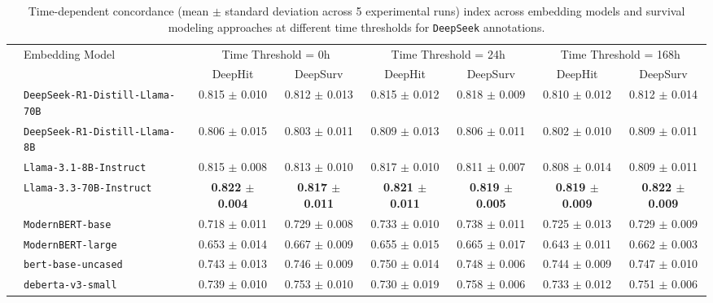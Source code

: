 \begin{table}[!thbp]
  \centering
  \caption{Time-dependent concordance (mean $\pm$ standard deviation across 5 experimental runs) index across embedding models and survival modeling approaches at different time thresholds for \texttt{DeepSeek} annotations.}
  \begin{adjustbox}{width=\textwidth}
  \begin{tabular}{c lcccccc}
    \toprule
    & \multirow{2}{*}{Embedding Model} &
      \multicolumn{2}{c}{Time Threshold = 0h} &
      \multicolumn{2}{c}{Time Threshold = 24h} &
      \multicolumn{2}{c}{Time Threshold = 168h} \\
    \cmidrule(lr){3-4} \cmidrule(lr){5-6} \cmidrule(lr){7-8}
    &  & DeepHit & DeepSurv & DeepHit & DeepSurv & DeepHit & DeepSurv \\
    \midrule
    & \texttt{DeepSeek-R1-Distill-Llama-70B} & 0.815 $\pm$ 0.010 & 0.812 $\pm$ 0.013 & 0.815 $\pm$ 0.012 & 0.818 $\pm$ 0.009 & 0.810 $\pm$ 0.012 & 0.812 $\pm$ 0.014 \\
    & \texttt{DeepSeek-R1-Distill-Llama-8B}  & 0.806 $\pm$ 0.015 & 0.803 $\pm$ 0.011 & 0.809 $\pm$ 0.013 & 0.806 $\pm$ 0.011 & 0.802 $\pm$ 0.010 & 0.809 $\pm$ 0.011 \\
    & \texttt{Llama-3.1-8B-Instruct}         & 0.815 $\pm$ 0.008 & 0.813 $\pm$ 0.010 & 0.817 $\pm$ 0.010 & 0.811 $\pm$ 0.007 & 0.808 $\pm$ 0.014 & 0.809 $\pm$ 0.011 \\
    & \texttt{Llama-3.3-70B-Instruct}        & \textbf{0.822 $\pm$ 0.004} & \textbf{0.817 $\pm$ 0.011} & \textbf{0.821 $\pm$ 0.011} & \textbf{0.819 $\pm$ 0.005} & \textbf{0.819 $\pm$ 0.009} & \textbf{0.822 $\pm$ 0.009} \\
    & \texttt{ModernBERT-base}               & 0.718 $\pm$ 0.011 & 0.729 $\pm$ 0.008 & 0.733 $\pm$ 0.010 & 0.738 $\pm$ 0.011 & 0.725 $\pm$ 0.013 & 0.729 $\pm$ 0.009 \\
    & \texttt{ModernBERT-large}              & 0.653 $\pm$ 0.014 & 0.667 $\pm$ 0.009 & 0.655 $\pm$ 0.015 & 0.665 $\pm$ 0.017 & 0.643 $\pm$ 0.011 & 0.662 $\pm$ 0.003 \\
    & \texttt{bert-base-uncased}             & 0.743 $\pm$ 0.013 & 0.746 $\pm$ 0.009 & 0.750 $\pm$ 0.014 & 0.748 $\pm$ 0.006 & 0.744 $\pm$ 0.009 & 0.747 $\pm$ 0.010 \\
    & \texttt{deberta-v3-small}              & 0.739 $\pm$ 0.010 & 0.753 $\pm$ 0.010 & 0.730 $\pm$ 0.019 & 0.758 $\pm$ 0.006 & 0.733 $\pm$ 0.012 & 0.751 $\pm$ 0.006 \\

\end{tabular}
\end{adjustbox}
\end{table}
